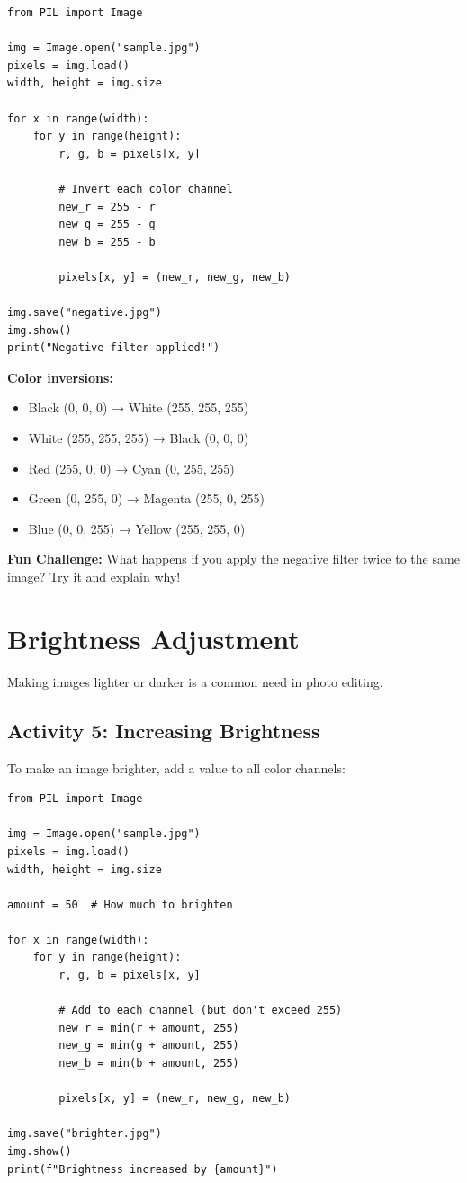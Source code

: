 \documentclass[11pt]{article}
\begin{document}
\begin{lstlisting}
from PIL import Image

img = Image.open("sample.jpg")
pixels = img.load()
width, height = img.size

for x in range(width):
    for y in range(height):
        r, g, b = pixels[x, y]

        # Invert each color channel
        new_r = 255 - r
        new_g = 255 - g
        new_b = 255 - b

        pixels[x, y] = (new_r, new_g, new_b)

img.save("negative.jpg")
img.show()
print("Negative filter applied!")
\end{lstlisting}

\textbf{Color inversions:}
\begin{itemize}
    \item Black (0, 0, 0) → White (255, 255, 255)
    \item White (255, 255, 255) → Black (0, 0, 0)
    \item Red (255, 0, 0) → Cyan (0, 255, 255)
    \item Green (0, 255, 0) → Magenta (255, 0, 255)
    \item Blue (0, 0, 255) → Yellow (255, 255, 0)
\end{itemize}

\textbf{Fun Challenge:} What happens if you apply the negative filter twice to the same image? Try it and explain why!

\section{Brightness Adjustment}

Making images lighter or darker is a common need in photo editing.

\subsection*{Activity 5: Increasing Brightness}

To make an image brighter, add a value to all color channels:

\begin{lstlisting}
from PIL import Image

img = Image.open("sample.jpg")
pixels = img.load()
width, height = img.size

amount = 50  # How much to brighten

for x in range(width):
    for y in range(height):
        r, g, b = pixels[x, y]

        # Add to each channel (but don't exceed 255)
        new_r = min(r + amount, 255)
        new_g = min(g + amount, 255)
        new_b = min(b + amount, 255)

        pixels[x, y] = (new_r, new_g, new_b)

img.save("brighter.jpg")
img.show()
print(f"Brightness increased by {amount}")
\end{lstlisting}
\end{document}
